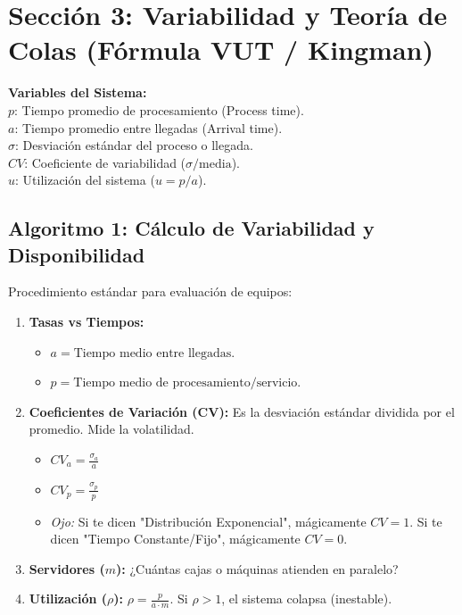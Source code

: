 \section{Sección 3: Variabilidad y Teoría de Colas (Fórmula VUT / Kingman)}

\begin{tcolorbox}[colback=blue!5!white,colframe=blue!60!black,title=Parámetros Fundamentales]
\textbf{Variables del Sistema:}\\
$p$: Tiempo promedio de procesamiento (Process time).\\
$a$: Tiempo promedio entre llegadas (Arrival time).\\
$\sigma$: Desviación estándar del proceso o llegada.\\
$CV$: Coeficiente de variabilidad ($\sigma / \text{media}$).\\
$u$: Utilización del sistema ($u = p / a$).
\end{tcolorbox}

\subsection{Algoritmo 1: Cálculo de Variabilidad y Disponibilidad}
Procedimiento estándar para evaluación de equipos:

\begin{enumerate}
    \item \textbf{Tasas vs Tiempos:}
    \begin{itemize}
        \item $a = \text{Tiempo medio entre llegadas}$.
        \item $p = \text{Tiempo medio de procesamiento/servicio}$.
    \end{itemize}
    \item \textbf{Coeficientes de Variación (CV):} Es la desviación estándar dividida por el promedio. Mide la volatilidad.
    \begin{itemize}
        \item $CV_a = \frac{\sigma_a}{a}$
        \item $CV_p = \frac{\sigma_p}{p}$
        \item \textit{Ojo:} Si te dicen "Distribución Exponencial", mágicamente $CV = 1$. Si te dicen "Tiempo Constante/Fijo", mágicamente $CV = 0$.
    \end{itemize}
    \item \textbf{Servidores ($m$):} ¿Cuántas cajas o máquinas atienden en paralelo?
    \item \textbf{Utilización ($\rho$):} $\rho = \frac{p}{a \cdot m}$. Si $\rho > 1$, el sistema colapsa (inestable).
\end{enumerate}

